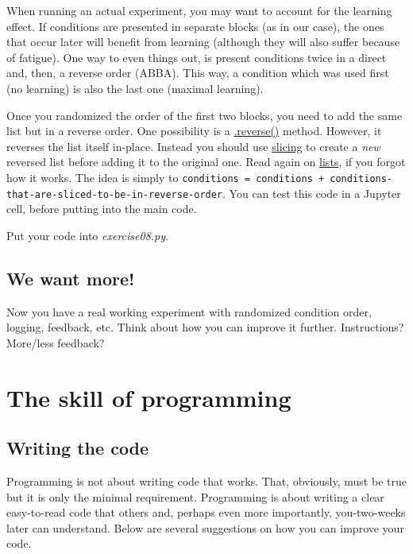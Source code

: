 \documentclass[
]{book}
\begin{document}
When running an actual experiment, you may want to account for the learning effect. If conditions are presented in separate blocks (as in our case), the ones that occur later will benefit from learning (although they will also suffer because of fatigue). One way to even things out, is present conditions twice in a direct and, then, a reverse order (ABBA). This way, a condition which was used first (no learning) is also the last one (maximal learning).

Once you randomized the order of the first two blocks, you need to add the same list but in a reverse order. One possibility is a \href{https://docs.python.org/3/tutorial/datastructures.html}{.reverse()} method. However, it reverses the list itself in-place. Instead you should use \href{https://docs.python.org/3/reference/expressions.html?highlight=slicing\#slicings}{slicing} to create a \emph{new} reversed list before adding it to the original one. Read again on \protect\hyperlink{lists}{lists}, if you forgot how it works. The idea is simply to \texttt{conditions\ =\ conditions\ +\ conditions-that-are-sliced-to-be-in-reverse-order}. You can test this code in a Jupyter cell, before putting into the main code.

Put your code into \emph{exercise08.py}.

\hypertarget{we-want-more}{%
\section{We want more!}\label{we-want-more}}

Now you have a real working experiment with randomized condition order, logging, feedback, etc. Think about how you can improve it further. Instructions? More/less feedback?

\hypertarget{the-skill-of-programming}{%
\chapter{The skill of programming}\label{the-skill-of-programming}}

\hypertarget{writing-the-code}{%
\section{Writing the code}\label{writing-the-code}}

Programming is not about writing code that works. That, obviously, must be true but it is only the minimal requirement. Programming is about writing a clear easy-to-read code that others and, perhaps even more importantly, you-two-weeks later can understand. Below are several suggestions on how you can improve your code.
\end{document}
